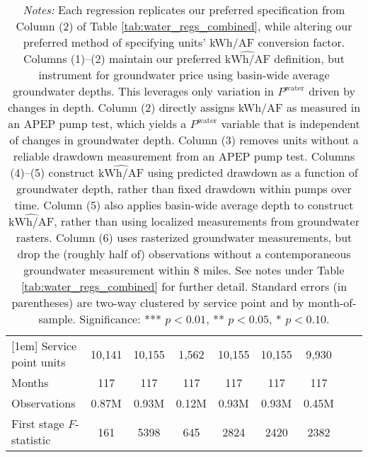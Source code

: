 \begin{table}[t!]
\begin{adjustbox}{center}
\begin{tabular}{lcccccccc}
[1em] 
Service point units & 10,141 & 10,155 & 1,562 & 10,155 & 10,155  & 9,930  \\ 
[0.1em] 
Months  & 117 & 117 & 117 & 117 & 117 & 117 \\ 
[0.1em] 
Observations & 0.87M & 0.93M & 0.12M & 0.93M & 0.93M & 0.45M  \\ 
[0.1em] 
First stage $F$-statistic & 161 & 5398 & 645 & 2824 & 2420 & 2382  \\ 
[0.15em]
\hline
\end{tabular}
\end{adjustbox}
\captionsetup{width=\textwidth}
\caption*{\scriptsize \emph{Notes:} 
Each regression replicates our preferred specification from Column (2) of Table \ref{tab:water_regs_combined}, 
while altering our preferred method of specifying units' kWh/AF conversion factor. 
Columns (1)--(2) maintain our preferred $\widehat{\text{kWh}/\text{AF}}$ definition, but instrument for groundwater price 
using basin-wide average groundwater depths. This leverages only variation in $P^{\text{water}}$ driven by changes in depth. 
Column (2) directly assigns kWh/AF as measured in an APEP pump test, which yields a $P^{\text{water}}$ variable that is 
independent of changes in groundwater depth. 
Column (3) removes units without a reliable drawdown measurement from an APEP pump test. 
Columns (4)--(5) construct $\widehat{\text{kWh}/\text{AF}}$ using predicted drawdown as a function of groundwater depth, 
rather than fixed drawdown within pumps over time. 
Column (5) also applies basin-wide average depth to construct  $\widehat{\text{kWh}/\text{AF}}$, rather than 
using localized measurements from groundwater rasters. 
Column (6) uses rasterized groundwater measurements, but drop the (roughly half of) observations without a contemporaneous 
groundwater measurement within 8 miles. 
See notes under Table \ref{tab:water_regs_combined} for further detail. 
Standard errors (in parentheses) are two-way clustered by service point and by month-of-sample.
Significance: *** $p < 0.01$, ** $p < 0.05$, * $p < 0.10$.
}
\end{table}
